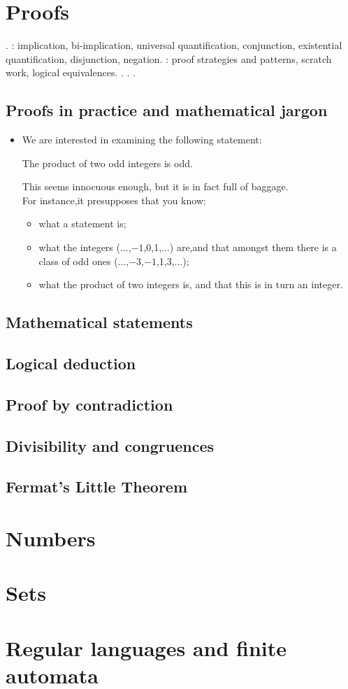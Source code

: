 \documentclass[a4paper]{article}
\begin{document}
\tableofcontents

\section{Proofs}

. : implication, bi-implication, universal quantiﬁcation, conjunction, existential quantiﬁcation, disjunction, negation. : proof strategies and patterns, scratch work, logical equivalences. . . . 

\subsection{Proofs in practice and mathematical jargon}

\begin{itemize}
\item[]
We are interested in examining the following statement:\\
\begin{stat}
The product of two odd integers is odd.\\
\end{stat}
This seems innocuous enough, but it is in fact full of baggage.\\
For instance,it presupposes that you know:
\begin{itemize}

\item what a statement is;
\item what the integers (...,$-1$,0,1,...) are,and that amongst them there is a class of odd ones (...,$-3$,$-1$,1,3,...);
\item what the product of two integers is, and that this is in turn an integer.

\end{itemize}



\end{itemize}
\subsection{Mathematical statements}
\subsection{Logical deduction}
\subsection{Proof by contradiction}
\subsection{Divisibility and congruences}
\subsection{Fermat’s Little Theorem}


\section{Numbers}

\section{Sets}

\section{Regular languages and finite automata}
\end{document}
